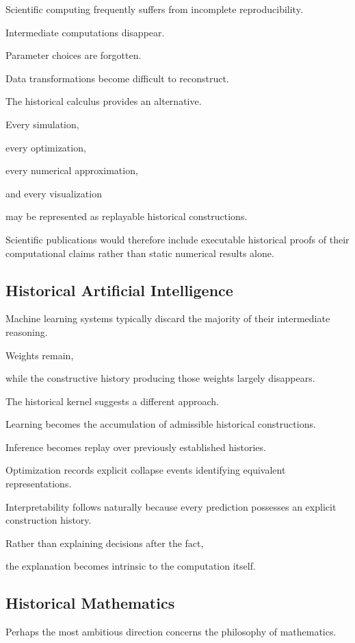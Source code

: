 \documentclass[12pt,oneside]{article}
\theoremstyle{definition}
\theoremstyle{remark}
\begin{document}
Scientific computing frequently suffers from incomplete reproducibility.

Intermediate computations disappear.

Parameter choices are forgotten.

Data transformations become difficult to reconstruct.

The historical calculus provides an alternative.

Every simulation,

every optimization,

every numerical approximation,

and every visualization

may be represented as replayable historical constructions.

Scientific publications would therefore include executable historical proofs of
their computational claims rather than static numerical results alone.

\subsection{Historical Artificial Intelligence}

Machine learning systems typically discard the majority of their intermediate
reasoning.

Weights remain,

while the constructive history producing those weights largely disappears.

The historical kernel suggests a different approach.

Learning becomes the accumulation of admissible historical constructions.

Inference becomes replay over previously established histories.

Optimization records explicit collapse events identifying equivalent
representations.

Interpretability follows naturally because every prediction possesses an
explicit construction history.

Rather than explaining decisions after the fact,

the explanation becomes intrinsic to the computation itself.

\subsection{Historical Mathematics}

Perhaps the most ambitious direction concerns the philosophy of mathematics.
\end{document}
